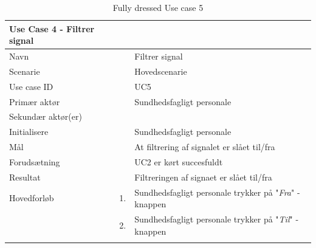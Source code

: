 \begin{longtabu} to 
\toprule
    {\large \textbf{Use Case 4 - Filtrer signal}} && \\
    \toprule
    Navn &&    Filtrer signal\\
    Scenarie &&    Hovedscenarie\\
    Use case ID &&    UC5\\
    Primær aktør &&    Sundhedsfagligt personale\\
    Sekundær aktør(er) &&    \\
    Initialisere &&    Sundhedsfagligt personale\\
    Mål &&    At filtrering af signalet er slået til/fra \\
    Forudsætning	&&	UC2 er kørt succesfuldt\\
    Resultat &&    Filtreringen af signaet er slået til/fra\\
    \toprule
    Hovedforløb &    1. &    Sundhedsfagligt personale trykker på "\textit{Fra}"\- -knappen\\[-1ex]
                &    2. &    Sundhedsfagligt personale trykker på "\textit{Til}"\- -knappen\\[-1ex]
                             \toprule
\caption{Fully dressed Use case 5}
\label{UC5}
\end{longtabu}
\newpage

